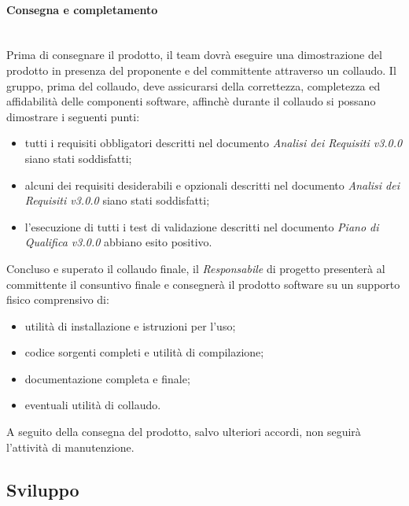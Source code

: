 \paragraph{Consegna e completamento} \-\\
Prima di consegnare il prodotto, il team dovrà eseguire una dimostrazione del prodotto
in presenza del proponente e del committente attraverso un collaudo. Il gruppo, prima del collaudo, deve assicurarsi della correttezza, completezza ed affidabilità delle componenti software, affinchè durante il collaudo si possano dimostrare i seguenti punti:
\begin{itemize}
	\item tutti i requisiti obbligatori descritti nel documento \textit{Analisi dei Requisiti v3.0.0} siano stati soddisfatti;
	\item alcuni dei requisiti desiderabili e opzionali descritti nel documento \textit{Analisi dei Requisiti v3.0.0} siano stati soddisfatti;
	\item l'esecuzione di tutti i test di validazione descritti nel documento \textit{Piano di Qualifica v3.0.0} abbiano esito positivo.
\end{itemize} 
Concluso e superato il collaudo finale, il \textit{Responsabile} di progetto presenterà al committente il consuntivo finale e consegnerà il prodotto software su un supporto fisico comprensivo di:
\begin{itemize}
	\item utilità di installazione e istruzioni per l'uso;
	\item codice sorgenti completi e utilità di compilazione;
	\item documentazione completa e finale;
	\item eventuali utilità di collaudo. 
\end{itemize}
A seguito della consegna del prodotto, salvo ulteriori accordi, non seguirà l'attività
di manutenzione.


\subsection{Sviluppo}\label{Sviluppo}
